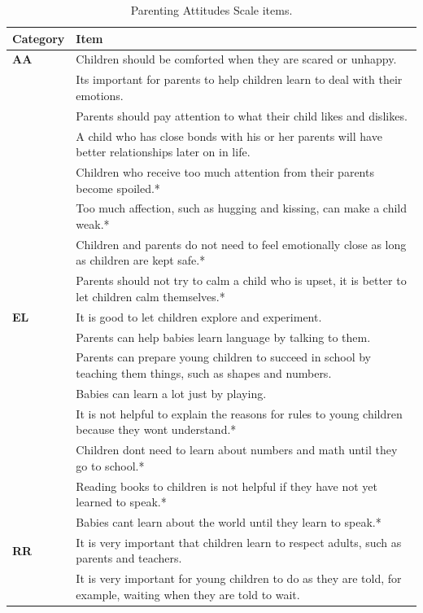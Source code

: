 \documentclass[floatsintext,man]{apa6}
\theoremstyle{definition}
\theoremstyle{definition}
\theoremstyle{definition}
\theoremstyle{remark}
\begin{document}
\begin{table}[!h]

\caption{\label{tab:itemstab}Parenting Attitudes Scale items.}
\centering
\fontsize{9}{11}\selectfont
\begin{tabular}[t]{>{\bfseries}l>{\raggedright\arraybackslash}p{40em}}
\toprule
Category & Item\\
\midrule
AA & Children should be comforted when they are scared or unhappy.\\
 & Its important for parents to help children learn to deal with their emotions.\\
 & Parents should pay attention to what their child likes and dislikes.\\
 & A child who has close bonds with his or her parents will have better relationships later on in life.\\
 & Children who receive too much attention from their parents become spoiled.*\\
\addlinespace
 & Too much affection, such as hugging and kissing, can make a child weak.*\\
 & Children and parents do not need to feel emotionally close as long as children are kept safe.*\\
 & Parents should not try to calm a child who is upset, it is better to let children calm themselves.*\\
EL & It is good to let children explore and experiment.\\
 & Parents can help babies learn language by talking to them.\\
\addlinespace
 & Parents can prepare young children to succeed in school by teaching them things, such as shapes and numbers.\\
 & Babies can learn a lot just by playing.\\
 & It is not helpful to explain the reasons for rules to young children because they wont understand.*\\
 & Children dont need to learn about numbers and math until they go to school.*\\
 & Reading books to children is not helpful if they have not yet learned to speak.*\\
\addlinespace
 & Babies cant learn about the world until they learn to speak.*\\
RR & It is very important that children learn to respect adults, such as parents and teachers.\\
 & It is very important for young children to do as they are told, for example, waiting when they are told to wait.\\

\end{tabular}
\end{table}
\end{document}
